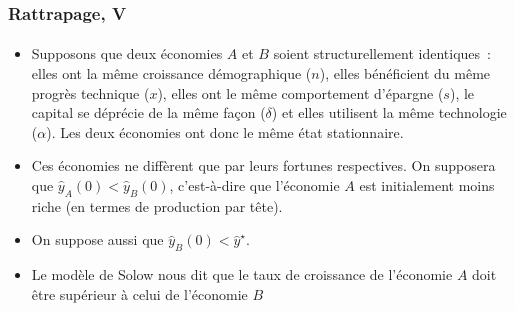 \documentclass[10pt,notheorems]{beamer}
\theoremstyle{plain}
\theoremstyle{definition} %
\begin{document}
\begin{frame}
  \frametitle{Rattrapage, V}
  \framesubtitle{}

  \begin{itemize}

  \item Supposons que deux économies $A$ et $B$ soient structurellement
    identiques~: elles ont la même croissance démographique ($n$), elles
    bénéficient du même progrès technique ($x$), elles ont le même comportement
    d'épargne ($s$), le capital se déprécie de la même façon ($\delta$) et elles
    utilisent la même technologie ($\alpha$). Les deux économies ont donc le même
    état stationnaire.\newline

  \item Ces économies ne diffèrent que par leurs fortunes respectives. On
    supposera que $\hat y_A(0)<\hat y_B(0)$, c'est-à-dire que l'économie $A$ est
    initialement moins riche (en termes de production par tête).\newline

  \item On suppose aussi que $\hat y_B(0)<\hat y^\star$.\newline

  \item Le modèle de Solow nous dit que le taux de croissance de l'économie $A$
    doit être supérieur à celui de l'économie $B$

  \end{itemize}

\end{frame}
\end{document}
